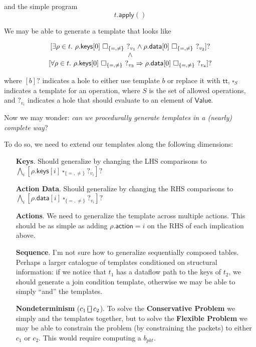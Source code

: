 \documentclass{article}
\newcommand{\TRUE}{\mathsf{tt}}
\newcommand{\Value}{\mathsf{Value}}
\newcommand{\action}{\mathsf{action}}
\newcommand{\keys}{\mathsf{keys}}
\newcommand{\data}{\mathsf{data}}
\newcommand{\apply}{\mathsf{apply}}
\newcommand{\choiceop}{\rotatebox[origin=c]{90}{$\sqsubset\!\!\!\sqsupset$}}
\newcommand{\choice}{\mathbin{\choiceop}}
\begin{document}
and the simple program \[t.\apply()\]

We may be able to generate a template that looks like

\[\begin{array}{>{\displaystyle}c}
  {[\exists \rho \in t.~ \rho.\keys[0]~\square_{\{=,\neq\}}~?_{v_1}\wedge \rho.\data[0]~\square_{\{=,\neq\}}~?_{v_2} ]?} \\
  \wedge\\
  {[\forall \rho \in t.~\rho.\keys[0]~\square_{\{=,\neq\}}~?_{v_3} \Rightarrow \rho.\data[0]~\square_{\{=,\neq\}}~?_{v_4}]?}
\end{array}\]

where $[b]?$ indicates a hole to either use template $b$ or replace it with
$\TRUE$, $\square_S$ indicates a template for an operation, where $S$ is the set
of allowed operations, and $?_{v_i}$ indicates a hole that should evaluate to an element
of $\Value$.

Now we may wonder: \emph{can we procedurally generate templates in a (nearly) complete way}?

To do so, we need to extend our templates along the following dimensions:
\begin{enumerate}[align=left]
\item[\textbf{Keys}.] Should generalize by changing the LHS comparisons to $
  \bigwedge_i[\rho.\keys[i]~\square_{\{=,\neq\}}~?_{v_i}]?$
\item[\textbf{Action Data}.] Should generalize by changing the RHS comparisons to $\bigwedge_i[\rho.\data[i]~\square_{\{=,\neq\}}~?_{v_i}]?$
\item[\textbf{Actions}.] We need to generalize the template across multiple actions. This should be as simple as adding $\rho.\action = i$ on the RHS of each implication above.
\item[\textbf{Sequence}.] I'm not sure how to generalize sequentially composed tables.
  Perhaps a larger catalogue of templates conditioned on structural information:
  if we notice that $t_1$ has a dataflow path to the keys of $t_2$, we should
  generate a join condition template, otherwise we may be able to simply ``and'' the templates.

\item[\textbf{Nondeterminism} ($c_1 \choice c_2$).] To solve the \textbf{Conservative
  Problem} we simply and the templates together, but to solve the
  \textbf{Flexible Problem} we may be able to constrain the problem (by
  constraining the packets) to either $c_1$ or $c_2$. This would require
  computing a $b_{\textit{pkt}}$.
\end{enumerate}
\end{document}
